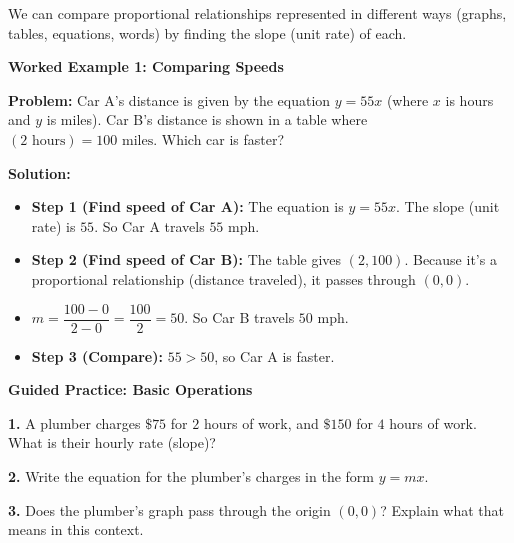 \documentclass[12pt, letterpaper, fleqn]{article}
\begin{document}
\noindent
We can compare proportional relationships represented in different ways (graphs, tables, equations, words) by finding the slope (unit rate) of each.

\vspace{3mm}

\begin{tcolorbox}[colback=white, colframe=black!25, boxrule=0.6pt, arc=4mm, left=6mm, right=6mm, top=5mm, bottom=5mm]

\textbf{Worked Example 1: Comparing Speeds}

\medskip

\textbf{Problem:} Car A's distance is given by the equation $y = 55x$ (where $x$ is hours and $y$ is miles). Car B's distance is shown in a table where $(2\text{ hours}) = 100\text{ miles}$. Which car is faster?

\medskip

\textbf{Solution:}
\begin{itemize}
    \item \textbf{Step 1 (Find speed of Car A):} The equation is $y = 55x$. The slope (unit rate) is $55$. So Car A travels $55$ mph.
    \item \textbf{Step 2 (Find speed of Car B):} The table gives $(2, 100)$. Because it's a proportional relationship (distance traveled), it passes through $(0,0)$. 
    \item $m = \dfrac{100 - 0}{2 - 0} = \dfrac{100}{2} = 50$. So Car B travels $50$ mph.
    \item \textbf{Step 3 (Compare):} $55 > 50$, so Car A is faster.
\end{itemize}

\end{tcolorbox}

\vspace{4mm}

\begin{tcolorbox}[colback=white!15, colframe=black, boxrule=1.5pt, arc=4mm, left=6mm, right=6mm, top=5mm, bottom=5mm]

\textbf{Guided Practice: Basic Operations}

\medskip

\noindent
\textbf{1.} A plumber charges $\$75$ for $2$ hours of work, and $\$150$ for $4$ hours of work. What is their hourly rate (slope)?
\vspace{1.5cm}

\noindent
\textbf{2.} Write the equation for the plumber's charges in the form $y = mx$.
\vspace{1.5cm}

\noindent
\textbf{3.} Does the plumber's graph pass through the origin $(0,0)$? Explain what that means in this context.
\vspace{1.5cm}

\end{tcolorbox}
\end{document}
